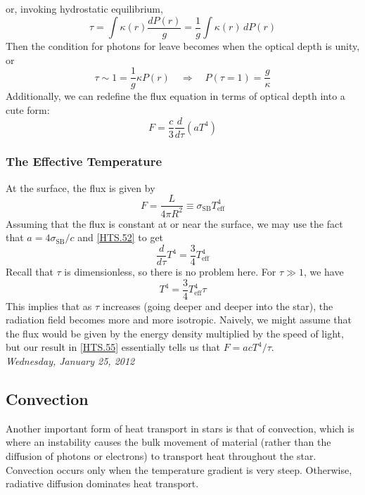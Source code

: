 \documentclass[10pt]{article}
\numberwithin{equation}{section}
\newcommand{\n}{\noindent}
\begin{document}
	or, invoking hydrostatic equilibrium,
	\begin{equation}
		\label{HTS.50} \tau=\int \kappa(r)\frac{dP(r)}{g}=\frac{1}{g}\int 
\kappa(r)\,dP(r)
	\end{equation}
	Then the condition for photons for leave becomes when the optical depth 
is unity, or
	\begin{equation}
		\label{HTS.51} \tau\sim1=\frac{1}{g}\kappa P(r)\quad\Rightarrow
\quad P(\tau=1)=\frac{g}{\kappa}
	\end{equation}
	Additionally, we can redefine the flux equation in terms of optical 
depth into a cute form:
	\begin{equation}
		\label{HTS.52} F=\frac{c}{3}\frac{d}{d\tau}\left(aT^4\right)
	\end{equation}
	\subsubsection{The Effective Temperature}
	At the surface, the flux is given by
	\begin{equation}
		\label{HTS.53} F=\frac{L}{4\pi R^2}\equiv \sigma_{\mathrm{SB}}T_
{\mathrm{eff}}^4
	\end{equation}
	Assuming that the flux is constant at or near the surface, we may use 
the fact that $a=4\sigma_{\mathrm{SB}}/c$ and \eqref{HTS.52} to get
	\begin{equation}
		\label{HTS.54} \frac{d}{d\tau}T^4=\frac{3}{4}T_{\mathrm{eff}}^4
	\end{equation}
	Recall that $\tau$ is dimensionless, so there is no problem here. For $
\tau\gg 1$, we have
	\begin{equation}
		\label{HTS.55} T^4=\frac{3}{4}T_{\mathrm{eff}}^4\tau
	\end{equation}
	This implies that as $\tau$ increases (going deeper and deeper
        into the star), the radiation field becomes more and more
        isotropic. Naively, we might assume that the flux would be
        given by the energy density multiplied by the speed of light,
        but our result in \eqref{HTS.55} essentially tells us that
        $F=acT^4/\tau$.\\

        \n \textit{Wednesday, January 25, 2012}
\subsection{Convection}
\label{sec:conv}
Another important form of heat transport in stars is that of
convection, which is where an instability causes the bulk movement of
material (rather than the diffusion of photons or electrons) to
transport heat throughout the star. Convection occurs only when the
temperature gradient is very steep. Otherwise, radiative diffusion
dominates heat transport.\\
\end{document}
